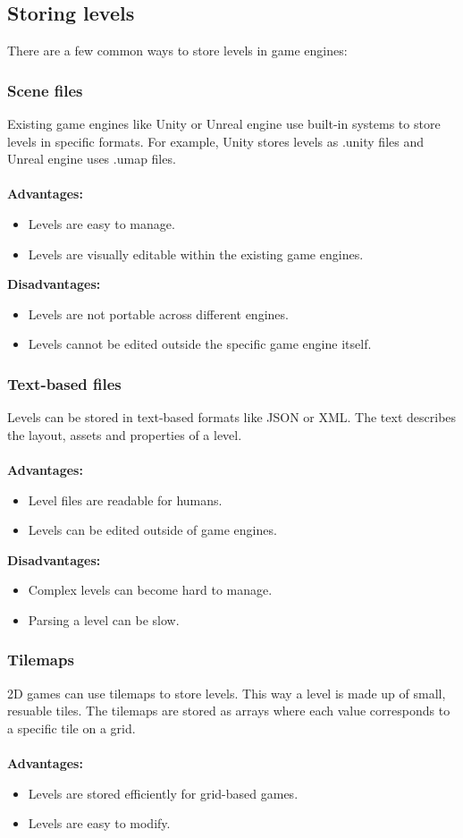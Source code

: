 \documentclass{article} %
\begin{document}
\subsection{Storing levels}
There are a few common ways to store levels in game engines:
\subsubsection {Scene files}
Existing game engines like Unity or Unreal engine use built-in systems to store levels in specific formats.
For example, Unity stores levels as .unity files and Unreal engine uses .umap files.
\\\\
\textbf{Advantages:}
\begin{itemize}
	\item Levels are easy to manage.
	\item Levels are visually editable within the existing game engines.
\end{itemize}

\noindent\textbf{Disadvantages:}
\begin{itemize}
	\item Levels are not portable across different engines.
	\item Levels cannot be edited outside the specific game engine itself.
\end{itemize}

\subsubsection{Text-based files}
Levels can be stored in text-based formats like JSON or XML.
The text describes the layout, assets and properties of a level.
\\\\
\textbf{Advantages:}
\begin{itemize}
	\item Level files are readable for humans.
	\item Levels can be edited outside of game engines.
\end{itemize}

\noindent\textbf{Disadvantages:}
\begin{itemize}
	\item Complex levels can become hard to manage.
	\item Parsing a level can be slow.
\end{itemize}

\subsubsection{Tilemaps}
2D games can use tilemaps to store levels. This way a level is made up of small, resuable tiles.
The tilemaps are stored as arrays where each value corresponds to a specific tile on a grid.
\\\\
\textbf{Advantages:}
\begin{itemize}
	\item Levels are stored efficiently for grid-based games.
	\item Levels are easy to modify.
\end{itemize}
\end{document}
